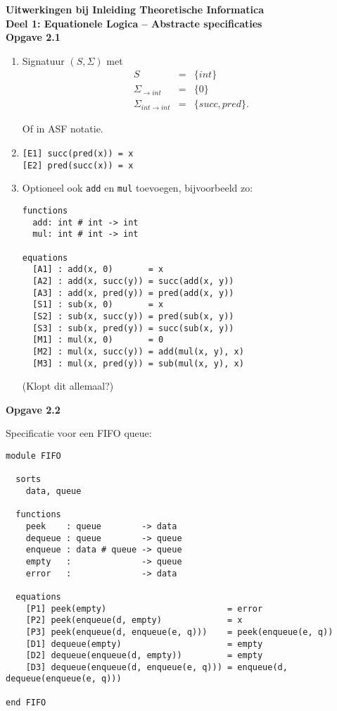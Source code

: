 \documentclass[a4paper,11pt]{article}
\begin{document}
{\bf Uitwerkingen bij Inleiding Theoretische Informatica\\
Deel 1: Equationele Logica -- Abstracte specificaties}\\[2em]


{\bf Opgave 2.1}

\begin{enumerate}

\item %
Signatuur $(S, \Sigma)$ met
\begin{eqnarray*}
S & = & \{int\} \\
\Sigma_{\rightarrow int} & = & \{0\} \\
\Sigma_{int \rightarrow int} & = & \{succ, pred\}.
\end{eqnarray*}

Of in ASF notatie.

\item %
\begin{verbatim}
[E1] succ(pred(x)) = x
[E2] pred(succ(x)) = x
\end{verbatim}

\item %
Optioneel ook \verb|add| en \verb|mul| toevoegen, bijvoorbeeld zo:

\begin{verbatim}
functions
  add: int # int -> int
  mul: int # int -> int

equations
  [A1] : add(x, 0)       = x
  [A2] : add(x, succ(y)) = succ(add(x, y))
  [A3] : add(x, pred(y)) = pred(add(x, y))
  [S1] : sub(x, 0)       = x
  [S2] : sub(x, succ(y)) = pred(sub(x, y))
  [S3] : sub(x, pred(y)) = succ(sub(x, y))
  [M1] : mul(x, 0)       = 0
  [M2] : mul(x, succ(y)) = add(mul(x, y), x)
  [M3] : mul(x, pred(y)) = sub(mul(x, y), x)
\end{verbatim}

(Klopt dit allemaal?)

\end{enumerate}


{\bf Opgave 2.2} %

Specificatie voor een FIFO queue:

\begin{verbatim}
module FIFO

  sorts
    data, queue

  functions
    peek    : queue        -> data
    dequeue : queue        -> queue
    enqueue : data # queue -> queue
    empty   :              -> queue
    error   :              -> data

  equations
    [P1] peek(empty)                        = error
    [P2] peek(enqueue(d, empty)             = x
    [P3] peek(enqueue(d, enqueue(e, q)))    = peek(enqueue(e, q))
    [D1] dequeue(empty)                     = empty
    [D2] dequeue(enqueue(d, empty))         = empty
    [D3] dequeue(enqueue(d, enqueue(e, q))) = enqueue(d, dequeue(enqueue(e, q)))

end FIFO
\end{verbatim}
\end{document}
